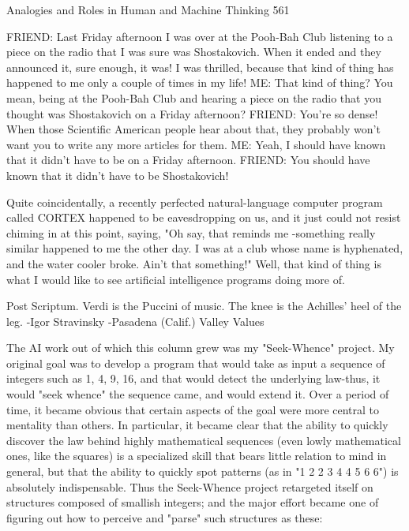 Analogies and Roles in Human and Machine Thinking                                         561

FRIEND: Last Friday afternoon I was over at the Pooh-Bah Club listening to a piece
  on the radio that I was sure was Shostakovich. When it ended and they announced
  it, sure enough, it was! I was thrilled, because that kind of thing has happened to
  me only a couple of times in my life!
ME: That kind of thing? You mean, being at the Pooh-Bah Club and hearing a piece
  on the radio that you thought was Shostakovich on a Friday afternoon?
FRIEND: You're so dense! When those Scientific American people hear about that,
  they probably won't want you to write any more articles for them.
ME: Yeah, I should have known that it didn't have to be on a Friday afternoon.
FRIEND: You should have known that it didn't have to be Shostakovich!

        Quite coincidentally, a recently perfected natural-language computer program
called CORTEX happened to be eavesdropping on us, and it just could not resist
chiming in at this point, saying, "Oh say, that reminds me -something really similar
happened to me the other day. I was at a club whose name is hyphenated, and the
water cooler broke. Ain't that something!" Well, that kind of thing is what I would
like to see artificial intelligence programs doing more of.


Post Scriptum.
Verdi is the Puccini of music.                The knee is the Achilles' heel of the leg.
               -Igor Stravinsky                      -Pasadena (Calif.) Valley Values

        The AI work out of which this column grew was my "Seek-Whence" project.
My original goal was to develop a program that would take as input a sequence of
integers such as 1, 4, 9, 16, and that would detect the underlying law-thus, it would
"seek whence" the sequence came, and would extend it. Over a period of time, it
became obvious that certain aspects of the goal were more central to mentality than
others. In particular, it became clear that the ability to quickly discover the law behind
highly mathematical sequences (even lowly mathematical ones, like the squares) is a
specialized skill that bears little relation to mind in general, but that the ability to
quickly spot patterns (as in "1 2 2 3 4 4 5 6 6") is absolutely indispensable.
        Thus the Seek-Whence project retargeted itself on structures composed of
smallish integers; and the major effort became one of figuring out how to perceive
and "parse" such structures as these:


